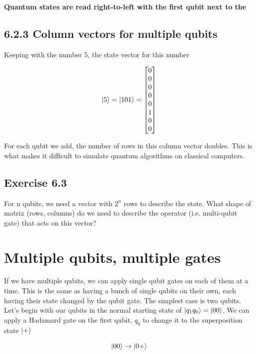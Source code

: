 \documentclass{book}
\begin{document}
\textbf{Quantum states are read right-to-left with the first qubit next to the $\>$}

\subsection{6.2.3 Column vectors for multiple qubits}

Keeping with the number 5, the state vector for this number 

$$ \ket{5} = \ket{101} = \begin{bmatrix} 0 \\ 0\\ 0\\ 0\\ 0\\ 1\\0\\0 \end{bmatrix} $$

For each qubit we add, the number of rows in this column vector doubles. This is what makes it difficult to simulate quantum algorithms on classical computers. \newline

\hline

\subsection{Exercise 6.3}

For n qubits, we need a vector with $2^n$ rows to describe the state. What shape of matrix (rows, columns) do we need to describe the operator (i.e. multi-qubit gate) that acts on this vector? \newline

\hline

\section{ Multiple qubits, multiple gates }


If we have multiple qubits, we can apply single qubit gates on each of them at a time. This is the same as having a bunch of single qubits on their own, each having their state changed by the qubit gate. The simplest case is two qubits. Let's begin with our qubits in the normal starting state of $\ket{q_1q_0} = \ket{00}$. We can apply a Hadamard gate on the first qubit, $q_0$ to change it to the superposition state $\ket{+}$

$$ \ket{00} \rightarrow \ket{0+} $$ 
\end{document}
